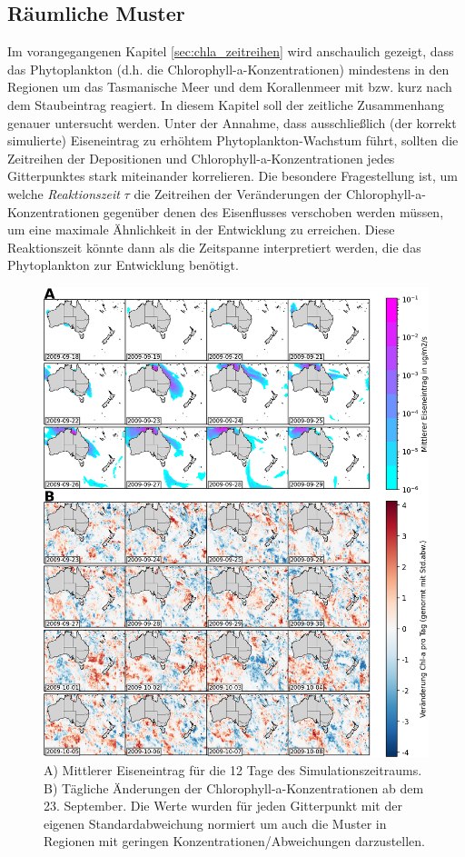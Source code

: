 \documentclass[12pt,a4paper,onecolumn]{scrartcl}
\begin{document}
\subsection{Räumliche Muster} \label{sec:auswertung_räuml_Muster}
Im vorangegangenen Kapitel \ref{sec:chla_zeitreihen} wird anschaulich gezeigt, dass das Phytoplankton (d.h. die Chlorophyll-a-Konzentrationen) mindestens in den Regionen um das Tasmanische Meer und dem Korallenmeer mit bzw. kurz nach dem Staubeintrag reagiert. In diesem Kapitel soll der zeitliche Zusammenhang genauer untersucht werden. Unter der Annahme, dass ausschließlich (der korrekt simulierte) Eiseneintrag zu erhöhtem Phytoplankton-Wachstum führt, sollten die Zeitreihen der Depositionen und Chlorophyll-a-Konzentrationen jedes Gitterpunktes stark miteinander korrelieren. Die besondere Fragestellung ist, um welche \textit{Reaktionszeit} $\tau$ die Zeitreihen der Veränderungen der Chlorophyll-a-Konzentrationen gegenüber denen des Eisenflusses verschoben werden müssen, um eine maximale Ähnlichkeit in der Entwicklung zu erreichen. Diese Reaktionszeit könnte dann als die Zeitspanne interpretiert werden, die das Phytoplankton zur Entwicklung benötigt.
\begin{figure}
\includegraphics[width=\textwidth]{bilder/snapshot_normalized.png}
\caption{A) Mittlerer Eiseneintrag für die 12 Tage des Simulationszeitraums. B) Tägliche Änderungen der Chlorophyll-a-Konzentrationen ab dem 23. September. Die Werte wurden für jeden Gitterpunkt mit der eigenen Standardabweichung normiert um auch die Muster in Regionen mit geringen Konzentrationen/Abweichungen darzustellen.} \label{fig:snapshot_fedep_chla}
\end{figure}
\end{document}
